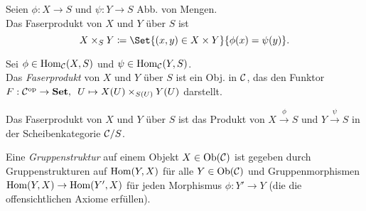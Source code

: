 \documentclass{cheat-sheet}
\newenvironment{centertikz}
  {\begin{center}\begin{tikzpicture}}
  {\end{tikzpicture}\end{center}}
\begin{document}

\begin{defn}
  Seien $\phi : X \to S$ und $\psi : Y \to S$ Abb. von Mengen. \\
  Das Faserprodukt von $X$ und $Y$ über $S$ ist
  \[ X \times_S Y \coloneqq \Set{ (x, y) \in X \times Y }{ \phi(x) = \psi(y) }. \]
\end{defn}

\begin{defn}
  Sei $\phi \in \operatorname{Hom}_{\mathcal{C}}(X, S)$ und $\psi \in \operatorname{Hom}_{\mathcal{C}}(Y, S)$. \\
  Das \emph{Faserprodukt} von $X$ und $Y$ über $S$ ist ein Obj. in $\mathcal{C}$, das den Funktor
  $F : \mathcal{C}^{\mathrm{op}} \to \mathbf{Set}, \enspace U \mapsto X(U) \times_{S(U)} Y(U)$ darstellt.
\end{defn}

\begin{bem}
  Das Faserprodukt von $X$ und $Y$ über $S$ ist das Produkt von $X \xrightarrow{\phi} S$ und $Y \xrightarrow{\psi} S$ in der Scheibenkategorie $\mathcal{C}/S$.
\end{bem}


\begin{defn}
  Eine \emph{Gruppenstruktur} auf einem Objekt $X \in \operatorname{Ob}(\mathcal{C})$ ist gegeben durch Gruppenstrukturen auf $\operatorname{Hom}(Y, X)$ für alle $Y \in \operatorname{Ob}(\mathcal{C})$ und Gruppenmorphismen $\operatorname{Hom}(Y, X) \to \operatorname{Hom}(Y', X)$ für jeden Morphismus $\phi : Y' \to Y$ (die die offensichtlichen Axiome erfüllen).
\end{defn}
\end{document}
